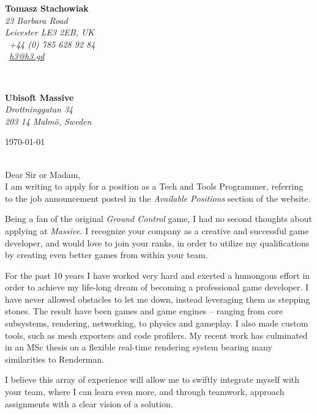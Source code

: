 \documentclass[11pt]{article}
\begin{document}
\hfill%
\begin{minipage}[t]{.6\textwidth}
\raggedleft%
{\bfseries Tomasz Stachowiak}\\[.35ex]
\small\itshape%
23 Barbara Road\\
Leicester LE3 2EB, UK\\[.35ex]
\Telefon~+44 (0) 785 628 92 84\\
\Letter~\href{mailto:h3@h3.gd}{h3@h3.gd}
\end{minipage}\\[1em]
%
\begin{minipage}[t]{.4\textwidth}
\raggedright%
{\bfseries Ubisoft Massive}\\[.35ex]
\small\itshape%
Drottninggatan 34\\
203 14 Malmö, Sweden
\end{minipage}
\hfill %
\begin{minipage}[t]{.4\textwidth}
\raggedleft %
\today
\end{minipage}\\[2em]
Dear Sir or Madam,\\[2.5em]
I am writing to apply for a position as a Tech and Tools Programmer, referring to the job announcement posted in the \emph{Available Positions} section of the website.

Being a fan of the original \emph{Ground Control} game, I had no second thoughts about applying at \emph{Massive}. I recognize your company as a creative and successful game developer, and would love to join your ranks, in order to utilize my qualifications by creating even better games from within your team.

For the past 10 years I have worked very hard and exerted a humongous effort in order to achieve my life-long dream of becoming a professional game developer. I have never allowed obstacles to let me down, instead leveraging them as stepping stones. The result have been games and game engines -- ranging from core subsystems, rendering, networking, to physics and gameplay. I also made custom tools, such as mesh exporters and code profilers. My recent work has culminated in an MSc thesis on a flexible real-time rendering system bearing many similarities to Renderman.

I believe this array of experience will allow me to swiftly integrate myself with your team, where I can learn even more, and through teamwork, approach assignments with a clear vision of a solution.
\end{document}

